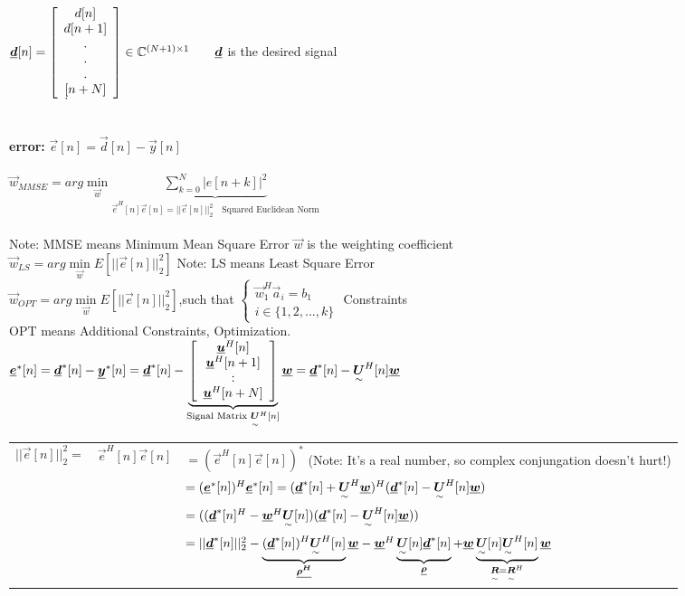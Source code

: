 \begin{doublespace}
$\vec{d}[n]= \left[\begin{array}{c}
d[n]\\ d[n+1]\\ .\\.\\. \\ \d[n+N]
\end{array}\right]\in \mathbb{C}^{(N+1)\times 1} \qquad \vec{d} $ is the desired signal\\ \\ \ \\
\textbf{error:} $\vec{e}[n]= \vec{d}[n]-\vec{y}[n]$\\ \ \\
$\vec{w}_{MMSE}= arg \min\limits_{\vec{w}} \underbrace{\sum_{k=0}^{N}|e[n+k]|^2}_{\vec{e}^H[n]\vec{e}[n]= ||\vec{e}[n]||_2^2 \quad \textrm{Squared Euclidean Norm}} $\\ \ \\
Note: MMSE means Minimum Mean Square Error \qquad $\vec{w}$ is the weighting coefficient\\
$\vec{w}_{LS}= arg  \min\limits_{\vec{w}} E[||\vec{e}[n]||_2^2]$ \qquad Note: LS means Least Square Error\\
$\vec{w}_{OPT}= arg  \min\limits_{\vec{w}}  E[||\vec{e}[n]||_2^2]$,\quad  such that \quad $\left\lbrace \begin{array}{l} \vec{w}_1^H\vec{a}_i=b_1\\ i \in \{1,2,...,k\} \end{array} \right.$ Constraints\\ 
OPT means Additional Constraints, Optimization.\\

$\vec{e}^*[n] = \vec{d}^*[n]-\vec{y}^*[n] = \vec{d}^*[n] -\underbrace{\left[\begin{array}{c}
\vec{u}^H[n] \\ \vec{u}^H[n+1] \\ \svdots \\ \vec{u}^H[n+N] \end{array}\right]}_{\text{Signal Matrix }\ma{U}^H[n]} \vec{w} = \vec{d}^*[n]-\ma{U}^H[n]\vec{w}$\\
  
\begin{tabular}{lll}
$||\vec{e}[n]||^2_2=$&$\vec{e}^H[n]\vec{e}[n]$ &$=(\vec{e}^H[n]\vec{e}[n])^*$ (\footnotesize Note: It's a real number, so complex conjungation doesn't hurt!\normalsize) \\
 &&$= (\vec{e}^*[n])^H\vec{e}^*[n]= (\vec{d}^*[n]+\ma{U}^H\vec{w})^H(\vec{d}^*[n]-\ma{U}^H[n]\vec{w})$\\
 &&$= ((\vec{d}^*[n]^H-\vec{w}^H\ma{U}[n])(\vec{d}^*[n]-\ma{U}^H[n]\vec{w}))$\\
 &&$= ||\vec{d}^*[n]||^2_2 -\underbrace{(\vec{d}^*[n])^H\ma{U}^H[n]}_{\vec{\rho^H}}\vec{w}-\vec{w}^H\underbrace{\ma{U}[n]\vec{d}^*[n]}_{\vec{\rho}}+\vec{w}\underbrace{\ma{U}[n]\ma{U}^H[n]}_{\ma{R}=\ma{R}^H}\vec{w}$\\
\end{tabular}
\end{doublespace}
